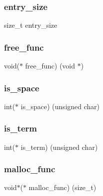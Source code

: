 \subsubsection{\texorpdfstring{entry\+\_\+size}{entry\_size}}
{\footnotesize\ttfamily size\+\_\+t entry\+\_\+size}

\hypertarget{structcsv__parser_aa8cedfd81f841b27885884598e1fafcf}{}\label{structcsv__parser_aa8cedfd81f841b27885884598e1fafcf} 
\subsubsection{\texorpdfstring{free\+\_\+func}{free\_func}}
{\footnotesize\ttfamily void($\ast$ free\+\_\+func) (void $\ast$)}

\hypertarget{structcsv__parser_a84bb1e129be92e0aede2b8f550663e40}{}\label{structcsv__parser_a84bb1e129be92e0aede2b8f550663e40} 
\subsubsection{\texorpdfstring{is\+\_\+space}{is\_space}}
{\footnotesize\ttfamily int($\ast$ is\+\_\+space) (unsigned char)}

\hypertarget{structcsv__parser_a69d7ecb460015723c67157151cdcdc4d}{}\label{structcsv__parser_a69d7ecb460015723c67157151cdcdc4d} 
\subsubsection{\texorpdfstring{is\+\_\+term}{is\_term}}
{\footnotesize\ttfamily int($\ast$ is\+\_\+term) (unsigned char)}

\hypertarget{structcsv__parser_ac3696e7898d2203393fa88c804f446b9}{}\label{structcsv__parser_ac3696e7898d2203393fa88c804f446b9} 
\subsubsection{\texorpdfstring{malloc\+\_\+func}{malloc\_func}}
{\footnotesize\ttfamily void$\ast$($\ast$ malloc\+\_\+func) (size\+\_\+t)}


